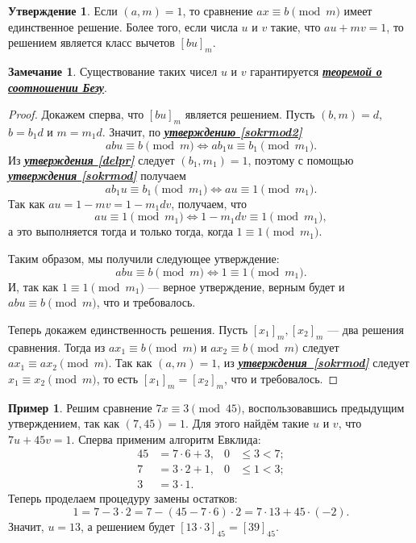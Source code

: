 \documentclass[14pt, a4paper]{extarticle}
\theoremstyle{definition}
\newtheorem*{remark}{Замечание}
\newtheorem{example}{Пример}
\newtheorem{statement}{Утверждение}
\begin{document}
	\begin{statement}
	\label{sol}
		Если $(a,m)=1$, то сравнение $ax\equiv b\pmod{m}$ имеет единственное решение. Более того, если числа $u$ и $v$ такие, что $au+mv=1$, то решением является класс вычетов $[bu]_m$.
	\end{statement}
	\begin{remark}
		Существование таких чисел $u$ и $v$ гарантируется \hyperref[bezu]{\textbf{\textit{теоремой о соотношении Безу}}}.
	\end{remark}
	\begin{proof}
		Докажем сперва, что $[bu]_m$ является решением. Пусть $(b,m)=d$, $b=b_1d$ и $m=m_1d$. Значит, по \hyperref[sokrmod2]{\textbf{\textit{утверждению \ref*{sokrmod2}}}}
		$$\boxed{abu\equiv b\pmod{m}\Leftrightarrow ab_1u\equiv b_1\pmod{m_1}}.$$
		Из \hyperref[delpr]{\textbf{\textit{утверждения \ref*{delpr}}}} следует $(b_1,m_1)=1$, поэтому с помощью \hyperref[sokrmod]{\textbf{\textit{утверждения \ref*{sokrmod}}}} получаем
		$$\boxed{ab_1u\equiv b_1\pmod{m_1}\Leftrightarrow au\equiv1\pmod{m_1}}.$$
		Так как $au=1-mv=1-m_1dv$, получаем, что
		$$\boxed{au\equiv1\pmod{m_1}\Leftrightarrow1-m_1dv\equiv1\pmod{m_1}},$$
		а это выполняется тогда и только тогда, когда $\boxed{1\equiv1\pmod{m_1}}$.
		
		Таким образом, мы получили следующее утверждение:
		$$\boxed{abu\equiv b\pmod{m}\Leftrightarrow1\equiv1\pmod{m_1}}.$$
		И, так как $1\equiv1\pmod{m_1}$ --- верное утверждение, верным будет и $abu\equiv b\pmod{m}$, что и требовалось.
		
		Теперь докажем единственность решения. Пусть $[x_1]_m, [x_2]_m$ --- два решения сравнения. Тогда из $ax_1\equiv b\pmod{m}$ и $ax_2\equiv b\pmod{m}$ следует $ax_1\equiv ax_2\pmod{m}$. Так как $(a,m)=1$, из \hyperref[sokrmod]{\textbf{\textit{утверждения~\ref*{sokrmod}}}} следует $x_1\equiv x_2\pmod{m}$, то есть $[x_1]_m=[x_2]_m$, что и требовалось.
	\end{proof}

	\begin{example}
		Решим сравнение $7x\equiv3\pmod{45}$, воспользовавшись предыдущим утверждением, так как $(7,45)=1$. Для этого найдём такие $u$ и $v$, что $7u+45v=1$. Сперва применим алгоритм Евклида:
		\begin{align*}
			45&=7\cdot6+3,&0&\leqslant3<7;\\
			7&=3\cdot2+1,&0&\leqslant1<3;\\
			3&=3\cdot1.
		\end{align*}
		Теперь проделаем процедуру замены остатков:
		$$\boxed{1=}7-3\cdot2=7-(45-7\cdot6)\cdot2=\boxed{7\cdot13+45\cdot(-2)}.$$
		Значит, $u=13$, а решением будет $[13\cdot3]_{45}=[39]_{45}$.
	\end{example}
\end{document}
